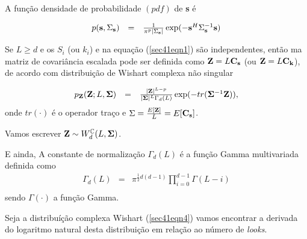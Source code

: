 \documentclass[10pt,a4paper]{article}
\begin{document}
A função densidade de probabilidade $(pdf)$ de {\bf s} é 

\begin{equation}\label{sec41eqn3}
\begin{array}{ccc}
	p({\bf s},\Sigma_{\bf s})&=&\frac{1}{\pi^p|\Sigma_{{\bf s}}|}\exp(-{\bf s}^{H}\Sigma_{{\bf s}}^{-1}{\bf s})  \\
\end{array}
\end{equation}

Se $L\geq d$ e os {\bf $S_i$} (ou {\bf $k_i$}) e na equação (\ref{sec41eqn1}) são independentes, então ma matriz de covariância escalada pode ser definida como ${\bf Z}=L{\bf C_{\bf s}}$ (ou ${\bf Z}=L{\bf C_{\bf k}}$), de acordo com distribuição de Wishart complexa não singular \cite{goodman1963}

\begin{equation}\label{sec41eqn4}
\begin{array}{ccc}
	p_{{\bf Z}}({\bf Z};L,{\bf \Sigma})&=&\frac{|{\bf Z}|^{L-p}}{|{\bf \Sigma}|^{L}\Gamma_d(L)} \exp(-tr({\bf \Sigma}^{-1}{\bf Z})), \\
\end{array}
\end{equation}
onde $tr(\cdot)$ é o operador traço e ${\Sigma}=\frac{E[{\bf Z}]}{L}=E[{\bf C_{s}}]$. 

Vamos escrever ${\bf Z}\sim W_d^{\mathbb C}(L, {\bf \Sigma})$.

E ainda, A constante de normalização $\Gamma_d(L)$ é a função Gamma multivariada definida como 
\begin{equation}\label{sec41eqn5}
\begin{array}{ccc}
	\Gamma_d(L)&=&\pi^{\frac{1}{2}d(d-1)} \displaystyle{\prod_{i=0}^{d-1}\Gamma(L-i)} \\
\end{array}
\end{equation}
sendo $\Gamma(\cdot)$ a função Gamma.

Seja a distribuíção complexa Wishart (\ref{sec41eqn4}) vamos encontrar a derivada do logaritmo natural desta distribuição em relação ao número de {\it looks}.
\end{document}
